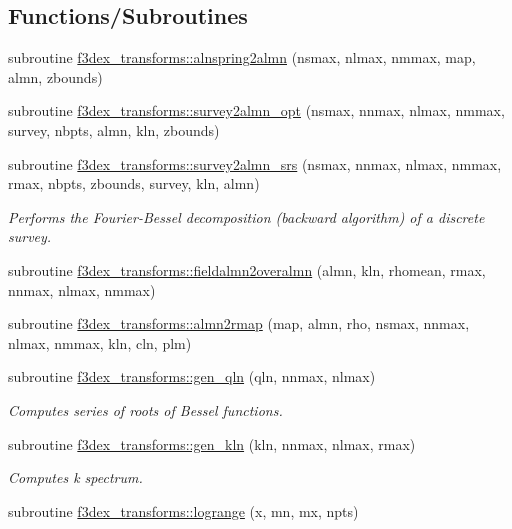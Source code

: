 \subsection*{Functions/Subroutines}
\begin{DoxyCompactItemize}
\item 
subroutine \hyperlink{namespacef3dex__transforms_aef309274871cf8eb0405b63f14ab26a2}{f3dex\_\-transforms::alnspring2almn} (nsmax, nlmax, nmmax, map, almn, zbounds)
\item 
subroutine \hyperlink{namespacef3dex__transforms_aa03041ae9480a0e4abc522b846a40cc8}{f3dex\_\-transforms::survey2almn\_\-opt} (nsmax, nnmax, nlmax, nmmax, survey, nbpts, almn, kln, zbounds)
\item 
subroutine \hyperlink{namespacef3dex__transforms_ae19f381573ccd64c64102bbd4181483f}{f3dex\_\-transforms::survey2almn\_\-srs} (nsmax, nnmax, nlmax, nmmax, rmax, nbpts, zbounds, survey, kln, almn)
\begin{DoxyCompactList}\small\item\em Performs the Fourier-\/Bessel decomposition (backward algorithm) of a discrete survey. \end{DoxyCompactList}\item 
subroutine \hyperlink{namespacef3dex__transforms_a4675d50d585b89b97772a0fa7dde4c5f}{f3dex\_\-transforms::fieldalmn2overalmn} (almn, kln, rhomean, rmax, nnmax, nlmax, nmmax)
\item 
subroutine \hyperlink{namespacef3dex__transforms_a3e792eb35f030b601d9262ac031cfdb9}{f3dex\_\-transforms::almn2rmap} (map, almn, rho, nsmax, nnmax, nlmax, nmmax, kln, cln, plm)
\item 
subroutine \hyperlink{namespacef3dex__transforms_a02b926f933d186f2c9d9ab6d478a1601}{f3dex\_\-transforms::gen\_\-qln} (qln, nnmax, nlmax)
\begin{DoxyCompactList}\small\item\em Computes series of roots of Bessel functions. \end{DoxyCompactList}\item 
subroutine \hyperlink{namespacef3dex__transforms_a4b80bc7cad52998fd0aff935a1695ee7}{f3dex\_\-transforms::gen\_\-kln} (kln, nnmax, nlmax, rmax)
\begin{DoxyCompactList}\small\item\em Computes k spectrum. \end{DoxyCompactList}\item 
subroutine \hyperlink{namespacef3dex__transforms_a2cd270ebc1186ae3872ab2e0068cff9d}{f3dex\_\-transforms::logrange} (x, mn, mx, npts)

\end{DoxyCompactItemize}
